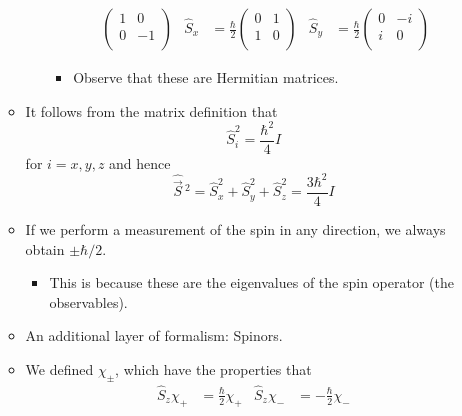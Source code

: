 \documentclass[../notes.tex]{subfiles}
\begin{document}
\begin{itemize}
\begin{itemize}
\begin{itemize}
\begin{align*}
\begin{pmatrix}
                    1 & 0\\
                    0 & -1\\
                \end{pmatrix}&
                \hat{S}_x &= \frac{\hbar}{2}
                \begin{pmatrix}
                    0 & 1\\
                    1 & 0\\
                \end{pmatrix}&
                \hat{S}_y &= \frac{\hbar}{2}
                \begin{pmatrix}
                    0 & -i\\
                    i & 0\\
                \end{pmatrix}
            \end{align*}
            \begin{itemize}
                \item Observe that these are Hermitian matrices.
            \end{itemize}
        \end{itemize}
        \item It follows from the matrix definition that
        \begin{equation*}
            \hat{S}_i^2 = \frac{\hbar^2}{4}I
        \end{equation*}
        for $i=x,y,z$ and hence
        \begin{equation*}
            \hat{\vec{S}}{\,}^2 = \hat{S}_x^2+\hat{S}_y^2+\hat{S}_z^2
            = \frac{3\hbar^2}{4}I
        \end{equation*}
        \item If we perform a measurement of the spin in any direction, we always obtain $\pm\hbar/2$.
        \begin{itemize}
            \item This is because these are the eigenvalues of the spin operator (the observables).
        \end{itemize}
        \item An additional layer of formalism: Spinors.
        \item We defined $\chi_\pm$, which have the properties that
        \begin{align*}
            \hat{S}_z\chi_+ &= \frac{\hbar}{2}\chi_+&
            \hat{S}_z\chi_- &= -\frac{\hbar}{2}\chi_-
        \end{align*}

\end{itemize}
\end{itemize}
\end{document}
